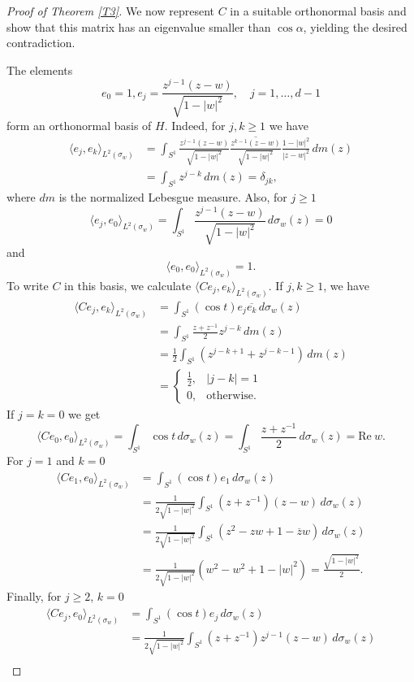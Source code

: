 \documentclass[reqno]{amsart}
\theoremstyle{definition}
\newcommand\Real{\mathrm{Re}}
\def\bar{\overline}
\numberwithin{equation}{section}
\begin{document}
\begin{proof}[Proof of Theorem \ref{T3}]
 We now represent $C$ in a suitable orthonormal basis and show that this matrix has an  eigenvalue smaller than $\cos\alpha$, yielding the desired contradiction.
  
  The elements 
  \[e_0=1,e_j=\frac{z^{j-1}(z-w)}{\sqrt{1-|w|^2}},\quad j=1,\ldots,d-1\]	
form an orthonormal basis of $H$. Indeed, for $j,k\ge 1$ we have 
\begin{align*}\langle e_j,e_k\rangle_{L^2(\sigma_w)}&=\int_{S^1}\frac{z^{j-1}(z-w)}{\sqrt{1-|w|^2}}\overline{\frac{z^{k-1}(z-w)}{\sqrt{1-|w|^2}}}\frac{1-|w|^2}{|z-w|^2}\,dm(z)\\&=\int_{S^1}z^{j-k}\,dm(z)=\delta_{jk},
\end{align*}
where $dm$ is the normalized Lebesgue measure. Also, for $j\ge 1$
\[\langle e_j,e_0\rangle_{L^2(\sigma_w)}=\int_{S^1}\frac{z^{j-1}(z-w)}{\sqrt{1-|w|^2}}\,d\sigma_w(z)=0\]
and
\[\langle e_0,e_0\rangle_{L^2(\sigma_w)}=1.\]
 To write $C$ in this basis, we calculate $\langle Ce_j,e_k\rangle_{L^2(\sigma_w)}$. If $j,k\ge 1$, we have 
 \begin{align*}
 	\langle Ce_j,e_k\rangle_{L^2(\sigma_w)}&=\int_{S^1}(\cos t)e_j\overline{e_k}\,d\sigma_w(z)\\&=\int_{S^1}\frac{z+z^{-1}}{2}z^{j-k}\,dm(z)\\
 	&=\frac12\int_{S^1}(z^{j-k+1}+z^{j-k-1})\,dm(z)\\
 	&=\begin{cases}
    \frac12,&|j-k|=1\\
    0,& \text{otherwise.}
\end{cases}
\end{align*}
If $j=k=0$ we get
\[\langle Ce_0,e_0\rangle_{L^2(\sigma_w)}=\int_{S^1}\cos t\,d\sigma_w(z)=\int_{S^1}\frac{z+z^{-1}}{2}\,d\sigma_w(z)
=\Real\ w.\]
For $j=1$ and $k=0$
 \begin{align*}
 	\langle Ce_1,e_0\rangle_{L^2(\sigma_w)}&=\int_{S^1}(\cos t)e_1\,d\sigma_w(z)\\&=\frac{1}{2\sqrt{1-|w|^2}}\int_{S^1}(z+z^{-1})(z-w)\,d\sigma_w(z)\\
 	&=\frac{1}{2\sqrt{1-|w|^2}}\int_{S^1}(z^2-zw+1-\bar zw)\,d\sigma_w(z)\\
 	&=\frac{1}{2\sqrt{1-|w|^2}}(w^2-w^2+1-|w|^2)=\frac{\sqrt{1-|w|^2}}{2}.
 \end{align*}
Finally, for $j\ge 2$, $k=0$
\begin{align*}
 	\langle Ce_j,e_0\rangle_{L^2(\sigma_w)}&=\int_{S^1}(\cos t)e_j\,d\sigma_w(z)\\&=\frac{1}{2\sqrt{1-|w|^2}}\int_{S^1}(z+z^{-1})z^{j-1}(z-w)\,d\sigma_w(z)\\

\end{align*}
\end{proof}
\end{document}

